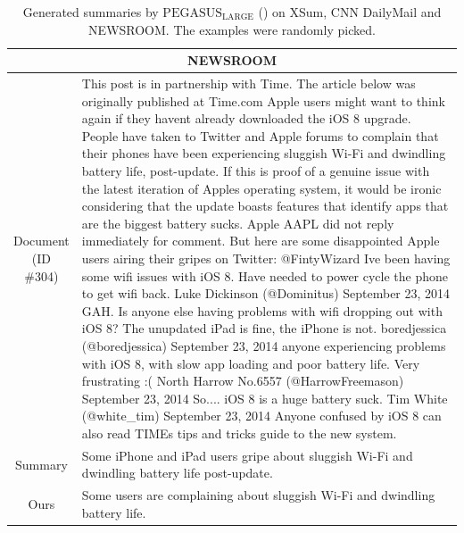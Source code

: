 \begin{table}[bth!]
\begin{tabular}{c|p{}}
  \multicolumn{2}{c}{NEWSROOM} \\ \hline
  \makecell{Document\\(ID \#304)} & This post is in partnership with Time. The article below was originally published at Time.com Apple users might want to think again if they havent already downloaded the iOS 8 upgrade. People have taken to Twitter and Apple forums to complain that their phones have been experiencing sluggish Wi-Fi and dwindling battery life, post-update. If this is proof of a genuine issue with the latest iteration of Apples operating system, it would be ironic considering that the update boasts features that identify apps that are the biggest battery sucks. Apple AAPL did not reply immediately for comment. But here are some disappointed Apple users airing their gripes on Twitter: @FintyWizard Ive been having some wifi issues with iOS 8. Have needed to power cycle the phone to get wifi back.  Luke Dickinson (@Dominitus) September 23, 2014 GAH. Is anyone else having problems with wifi dropping out with iOS 8? The unupdated iPad is fine, the iPhone is not.  boredjessica (@boredjessica) September 23, 2014 anyone experiencing problems with iOS 8, with slow app loading and poor battery life. Very frustrating :(  North Harrow No.6557 (@HarrowFreemason) September 23, 2014 So.... iOS 8 is a huge battery suck.  Tim White (@white\_tim) September 23, 2014 Anyone confused by iOS 8 can also read TIMEs tips and tricks guide to the new system. \\\hline
  Summary & Some iPhone and iPad users gripe about sluggish Wi-Fi and dwindling battery life post-update. \\\hline
  Ours & Some users are complaining about sluggish Wi-Fi and dwindling battery life. \\\hline
  
  
  
  \end{tabular}
  \caption{Generated summaries by $\text{PEGASUS}_{\text{LARGE}}$ (\gnews) on XSum, CNN DailyMail and NEWSROOM. The examples were randomly picked.}
  \label{tab:qualitative_1}
\end{table}


